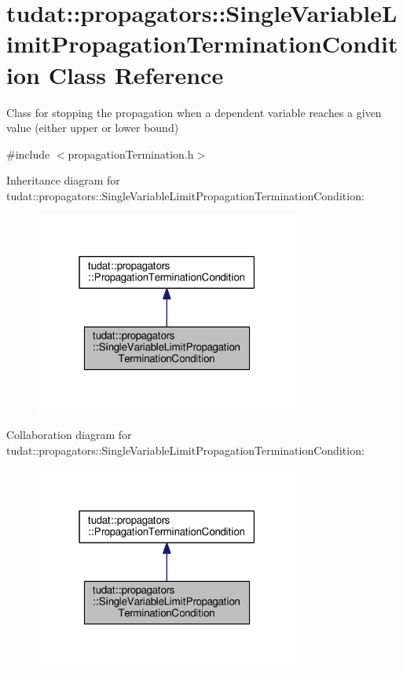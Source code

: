 \hypertarget{classtudat_1_1propagators_1_1SingleVariableLimitPropagationTerminationCondition}{}\section{tudat\+:\+:propagators\+:\+:Single\+Variable\+Limit\+Propagation\+Termination\+Condition Class Reference}
\label{classtudat_1_1propagators_1_1SingleVariableLimitPropagationTerminationCondition}


Class for stopping the propagation when a dependent variable reaches a given value (either upper or lower bound)  




{\ttfamily \#include $<$propagation\+Termination.\+h$>$}



Inheritance diagram for tudat\+:\+:propagators\+:\+:Single\+Variable\+Limit\+Propagation\+Termination\+Condition\+:
\nopagebreak
\begin{figure}[H]
\begin{center}
\leavevmode
\includegraphics[width=247pt]{classtudat_1_1propagators_1_1SingleVariableLimitPropagationTerminationCondition__inherit__graph}
\end{center}
\end{figure}


Collaboration diagram for tudat\+:\+:propagators\+:\+:Single\+Variable\+Limit\+Propagation\+Termination\+Condition\+:
\nopagebreak
\begin{figure}[H]
\begin{center}
\leavevmode
\includegraphics[width=247pt]{classtudat_1_1propagators_1_1SingleVariableLimitPropagationTerminationCondition__coll__graph}
\end{center}
\end{figure}
